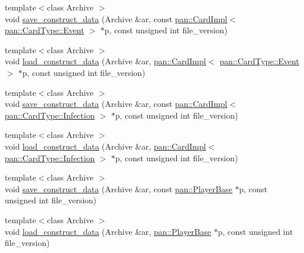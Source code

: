 \begin{DoxyCompactItemize}
\item 
{\footnotesize template$<$class Archive $>$ }\\void \hyperlink{namespaceboost_1_1serialization_aa5da5003acf4fa37f8c3b0f7c210f45f}{save\+\_\+construct\+\_\+data} (Archive \&ar, const \hyperlink{classpan_1_1_card_impl}{pan\+::\+Card\+Impl}$<$ \hyperlink{namespacepan_a1f7350bfd0421afeabe9fa95c16fa811aa4ecfc70574394990cf17bd83df499f7}{pan\+::\+Card\+Type\+::\+Event} $>$ $\ast$p, const unsigned int file\+\_\+version)
\item 
{\footnotesize template$<$class Archive $>$ }\\void \hyperlink{namespaceboost_1_1serialization_a9d377eba228f523e12084976fe9a094a}{load\+\_\+construct\+\_\+data} (Archive \&ar, \hyperlink{classpan_1_1_card_impl}{pan\+::\+Card\+Impl}$<$ \hyperlink{namespacepan_a1f7350bfd0421afeabe9fa95c16fa811aa4ecfc70574394990cf17bd83df499f7}{pan\+::\+Card\+Type\+::\+Event} $>$ $\ast$p, const unsigned int file\+\_\+version)
\item 
{\footnotesize template$<$class Archive $>$ }\\void \hyperlink{namespaceboost_1_1serialization_a2bf21e44658422c6c8e8687dbe493534}{save\+\_\+construct\+\_\+data} (Archive \&ar, const \hyperlink{classpan_1_1_card_impl}{pan\+::\+Card\+Impl}$<$ \hyperlink{namespacepan_a1f7350bfd0421afeabe9fa95c16fa811af0ddc0838281faf6d55e2cf840a2a8ef}{pan\+::\+Card\+Type\+::\+Infection} $>$ $\ast$p, const unsigned int file\+\_\+version)
\item 
{\footnotesize template$<$class Archive $>$ }\\void \hyperlink{namespaceboost_1_1serialization_a89dc559f1a8d84e022a738288cdfea24}{load\+\_\+construct\+\_\+data} (Archive \&ar, \hyperlink{classpan_1_1_card_impl}{pan\+::\+Card\+Impl}$<$ \hyperlink{namespacepan_a1f7350bfd0421afeabe9fa95c16fa811af0ddc0838281faf6d55e2cf840a2a8ef}{pan\+::\+Card\+Type\+::\+Infection} $>$ $\ast$p, const unsigned int file\+\_\+version)
\item 
{\footnotesize template$<$class Archive $>$ }\\void \hyperlink{namespaceboost_1_1serialization_a0187526a4d05f2f351784cddd5b82b6c}{save\+\_\+construct\+\_\+data} (Archive \&ar, const \hyperlink{classpan_1_1_player_base}{pan\+::\+Player\+Base} $\ast$p, const unsigned int file\+\_\+version)
\item 
{\footnotesize template$<$class Archive $>$ }\\void \hyperlink{namespaceboost_1_1serialization_a3847d195920e64d3cc539225f4fe261b}{load\+\_\+construct\+\_\+data} (Archive \&ar, \hyperlink{classpan_1_1_player_base}{pan\+::\+Player\+Base} $\ast$p, const unsigned int file\+\_\+version)
\end{DoxyCompactItemize}


